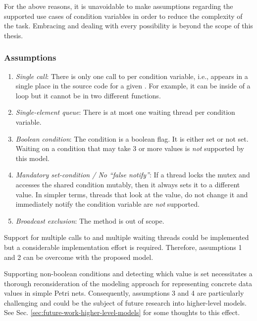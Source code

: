 For the above reasons, it is unavoidable to make assumptions
regarding the supported use cases of condition variables
in order to reduce the complexity of the task.
Embracing and dealing with every possibility is beyond the scope of this thesis.

\subsubsection{Assumptions}

\begin{enumerate}
      \item \emph{Single call}: There is only one call to  per condition variable, i.e.,
             appears in a single place in the source code for a given .
            For example, it can be inside of a loop but it cannot be in two different functions.
      \item \emph{Single-element queue}: There is at most one waiting thread per condition variable.
      \item \emph{Boolean condition}: The condition is a boolean flag. It is either set or not set.
            Waiting on a condition that may take 3 or more values is \emph{not} supported by this model.
      \item \emph{Mandatory set-condition / No ``false notify''}: If a thread locks the mutex and accesses the shared condition mutably,
            then it always sets it to a different value.
            In simpler terms, threads that look at the value, do not change it
            and immediately notify the condition variable are \emph{not} supported.
      \item \emph{Broadcast exclusion}: The method  is out of scope.
\end{enumerate}

Support for multiple calls to  and multiple waiting threads could be implemented
but a considerable implementation effort is required.
Therefore, assumptions 1 and 2 can be overcome with the proposed model.

Supporting non-boolean conditions
and detecting which value is set
necessitates a thorough reconsideration of the modeling approach
for representing concrete data values in simple Petri nets.
Consequently, assumptions 3 and 4 are particularly challenging and
could be the subject of future research into higher-level models.
See Sec. \ref{sec:future-work-higher-level-models} for some thoughts to this effect.

